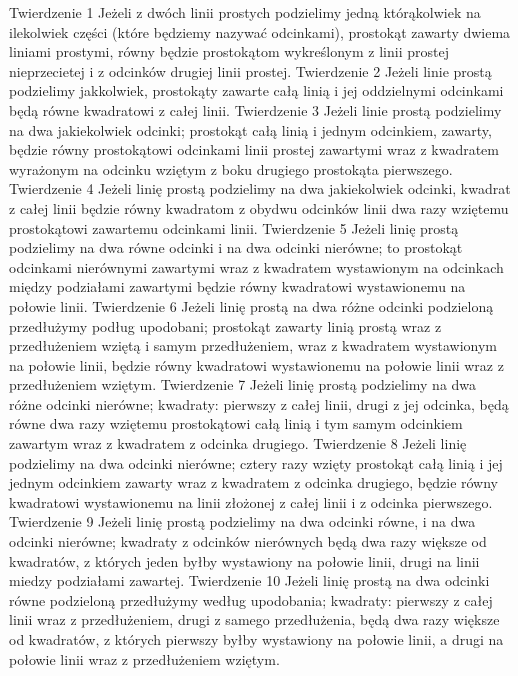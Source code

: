 Twierdzenie 1
    Jeżeli z dwóch linii prostych podzielimy jedną którąkolwiek na ilekolwiek części (które będziemy nazywać odcinkami), prostokąt zawarty dwiema liniami prostymi, równy będzie prostokątom wykreślonym z linii prostej nieprzecietej i z odcinków drugiej linii prostej.
Twierdzenie 2
    Jeżeli linie prostą podzielimy jakkolwiek, prostokąty zawarte całą linią i jej oddzielnymi odcinkami będą równe kwadratowi z całej linii.
Twierdzenie 3
    Jeżeli linie prostą podzielimy na dwa jakiekolwiek odcinki; prostokąt całą linią i jednym odcinkiem, zawarty, będzie równy prostokątowi odcinkami linii prostej zawartymi wraz z kwadratem wyrażonym na odcinku wziętym z boku drugiego prostokąta pierwszego.
Twierdzenie 4
    Jeżeli linię prostą podzielimy na dwa jakiekolwiek odcinki, kwadrat z całej linii będzie równy kwadratom z obydwu odcinków linii dwa razy wziętemu prostokątowi zawartemu odcinkami linii.
Twierdzenie 5
    Jeżeli linię prostą podzielimy na dwa równe odcinki i na dwa odcinki nierówne; to prostokąt odcinkami nierównymi zawartymi wraz z kwadratem wystawionym na odcinkach między podziałami zawartymi będzie równy kwadratowi wystawionemu na połowie linii.
Twierdzenie 6
    Jeżeli linię prostą na dwa różne odcinki podzieloną przedłużymy podług upodobani; prostokąt zawarty linią prostą wraz z przedłużeniem wziętą i samym przedłużeniem, wraz z kwadratem wystawionym na połowie linii, będzie równy kwadratowi wystawionemu na połowie linii wraz z przedłużeniem wziętym.
Twierdzenie 7
    Jeżeli linię prostą podzielimy na dwa różne odcinki nierówne; kwadraty: pierwszy z całej linii, drugi z jej odcinka, będą równe dwa razy wziętemu prostokątowi całą linią i tym samym odcinkiem zawartym wraz z kwadratem z odcinka drugiego.
Twierdzenie 8
    Jeżeli linię podzielimy na dwa odcinki nierówne; cztery razy wzięty prostokąt całą linią i jej jednym odcinkiem zawarty wraz z kwadratem z odcinka drugiego, będzie równy kwadratowi wystawionemu na linii złożonej z całej linii i z odcinka pierwszego. 
Twierdzenie 9
    Jeżeli linię prostą podzielimy na dwa odcinki równe, i na dwa odcinki nierówne; kwadraty z odcinków nierównych będą dwa razy większe od kwadratów, z których jeden byłby wystawiony na połowie linii, drugi na linii miedzy podziałami zawartej.
Twierdzenie 10
    Jeżeli linię prostą na dwa odcinki równe podzieloną przedłużymy według upodobania; kwadraty: pierwszy z całej linii wraz z przedłużeniem, drugi z samego przedłużenia, będą dwa razy większe od kwadratów, z których pierwszy byłby wystawiony na połowie linii, a drugi na połowie linii wraz z przedłużeniem wziętym.
